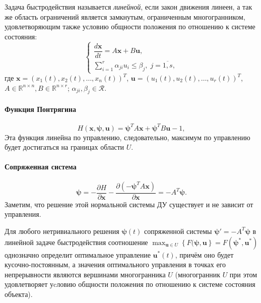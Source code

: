 
\begin{definition}
  Задача быстродействия называется \emph{линейной}, если закон движения линеен, а так же область ограничений является замкнутым, ограниченным многогранником, удовлетворяющим также условию общности положения по отношению к системе состояния:
  \[
    \begin{cases}
      \dfrac{d\mathbf{x}}{dt} = A\mathbf{x} + B\mathbf{u}, \\
      \sum_{i=1}^r \alpha_{ji} u_i \leqslant \beta_j, \; j=\overline{1, s},
    \end{cases}
  \]
  где $\mathbf{x} = \left( x_1(t), x_2(t), \dots, x_n(t) \right)^T$,
  $\mathbf{u} = \left( u_1(t), u_2(t), \dots, u_r(t) \right)^T$,
  $A \in \mathbb{R}^{n\times n}, B \in \mathbb{R}^{n\times r}$;
  $\alpha_{ji}, \beta_j \in \mathcal{R}$. 
\end{definition}

\paragraph{Функция Понтрягина}
\[
  H(\mathbf{x}, \mathbf{\psi}, \mathbf{u}) = \mathbf{\psi}^T A \mathbf{x} + \mathbf{\psi}^T B \mathbf{u} - 1,
\]
Эта функция линейна по управлению, следовательно, максимум по управлению будет достигаться на границах области $U$.


\paragraph{Сопряженная система}
\[
  \mathbf{\psi} = - \dfrac{\partial H}{\partial \mathbf{x}} - \dfrac{\partial (- \mathbf{\psi}^T A \mathbf{x})}{\partial \mathbf{x}} = - A^T \mathbf{\psi}.
\]
Заметим, что решение этой нормальной системы ДУ существует и не зависит от управления.

\begin{theorem}
  Для любого нетривиального решения $\mathbf{\psi}(t)$ сопряженной системы
  $\mathbf{\psi}' = -A^T \mathbf{\psi}$ в линейной задаче быстродействия соотношение
  $\max_{\mathbf{u} \in U} \left\{ F(\mathbf{\psi}, \mathbf{u} \right\} =
  F(\mathbf{\psi}^*, \mathbf{u}^*)$ однозначно определит оптимальное управление $\mathbf{u}^*(t)$,
  причём оно будет кусочно-постоянным, а значения оптимального управления в точках его
  непрерывности являются вершинами многогранника $U$ (многогранник $U$ при этом удовлетворяет
  уcловию общности положения по отношению к системе состояния объекта).
\end{theorem}

